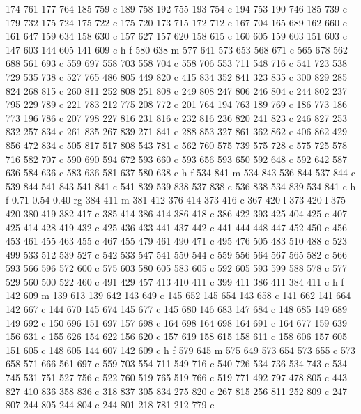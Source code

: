 {{   174 761 177 764 185 759 c
   189 758 192 755 193 754 c
   194 753 190 746 185 739 c
   179 732 175 724 175 722 c
   175 720 173 715 172 712 c
   167 704 165 689 162 660 c
   161 647 159 634 158 630 c
   157 627 157 620 158 615 c
   160 605 159 603 151 603 c
   147 603 144 605 141 609 c
   h f
   580 638 m
   577 641 573 653 568 671 c
   565 678 562 688 561 693 c
   559 697 558 703 558 704 c
   558 706 553 711 548 716 c
   541 723 538 729 535 738 c
   527 765 486 805 449 820 c
   415 834 352 841 323 835 c
   300 829 285 824 268 815 c
   260 811 252 808 251 808 c
   249 808 247 806 246 804 c
   244 802 237 795 229 789 c
   221 783 212 775 208 772 c
   201 764 194 763 189 769 c
   186 773 186 773 196 786 c
   207 798 227 816 231 816 c
   232 816 236 820 241 823 c
   246 827 253 832 257 834 c
   261 835 267 839 271 841 c
   288 853 327 861 362 862 c
   406 862 429 856 472 834 c
   505 817 517 808 543 781 c
   562 760 575 739 575 728 c
   575 725 578 716 582 707 c
   590 690 594 672 593 660 c
   593 656 593 650 592 648 c
   592 642 587 636 584 636 c
   583 636 581 637 580 638 c
   h f
   534 841 m
   534 843 536 844 537 844 c
   539 844 541 843 541 841 c
   541 839 539 838 537 838 c
   536 838 534 839 534 841 c
   h f
   0.71 0.54 0.40 rg
   384 411 m
   381 412 376 414 373 416 c
   367 420 l
   373 420 l
   375 420 380 419 382 417 c
   385 414 386 414 386 418 c
   386 422 393 425 404 425 c
   407 425 414 428 419 432 c
   425 436 433 441 437 442 c
   441 444 448 447 452 450 c
   456 453 461 455 463 455 c
   467 455 479 461 490 471 c
   495 476 505 483 510 488 c
   523 499 533 512 539 527 c
   542 533 547 541 550 544 c
   559 556 564 567 565 582 c
   566 593 566 596 572 600 c
   575 603 580 605 583 605 c
   592 605 593 599 588 578 c
   577 529 560 500 522 460 c
   491 429 457 413 410 411 c
   399 411 386 411 384 411 c
   h f
   142 609 m
   139 613 139 642 143 649 c
   145 652 145 654 143 658 c
   141 662 141 664 142 667 c
   144 670 145 674 145 677 c
   145 680 146 683 147 684 c
   148 685 149 689 149 692 c
   150 696 151 697 157 698 c
   164 698 164 698 164 691 c
   164 677 159 639 156 631 c
   155 626 154 622 156 620 c
   157 619 158 615 158 611 c
   158 606 157 605 151 605 c
   148 605 144 607 142 609 c
   h f
   579 645 m
   575 649 573 654 573 655 c
   573 658 571 666 561 697 c
   559 703 554 711 549 716 c
   540 726 534 736 534 743 c
   534 745 531 751 527 756 c
   522 760 519 765 519 766 c
   519 771 492 797 478 805 c
   443 827 410 836 358 836 c
   318 837 305 834 275 820 c
   267 815 256 811 252 809 c
   247 807 244 805 244 804 c
   244 801 218 781 212 779 c
}}
